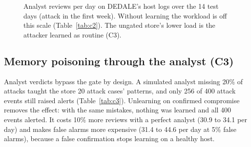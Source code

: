 \documentclass[conference]{IEEEtran}
\begin{document}
\begin{figure}[t]
\centering
{}
\caption{Analyst reviews per day on DEDALE's host logs over the 14 test days (attack in the first week). Without
learning the workload is off this scale (Table~\ref{tab:c2}). The ungated store's lower load is the attacker learned
as routine (C3).}
\label{fig:days}
\end{figure}

\begin{table}[t]
\caption{Learning modes on DEDALE host logs (14 test days, NCE off).}\label{tab:c2}
\centering\small
{}
\end{table}

\subsection{Memory poisoning through the analyst (C3)}
Analyst verdicts bypass the gate by design. A simulated analyst missing 20\% of attacks taught the store 20 attack
cases' patterns, and only 256 of 400 attack events still raised alerts (Table~\ref{tab:c3}). Unlearning on
confirmed compromise removes the effect: with the same mistakes, nothing was learned and all 400 events alerted.
It costs 10\% more reviews with a perfect analyst (30.9 to 34.1 per day) and makes false alarms more expensive
(31.4 to 44.6 per day at 5\% false alarms), because a false confirmation stops learning on a healthy host.
\end{document}
